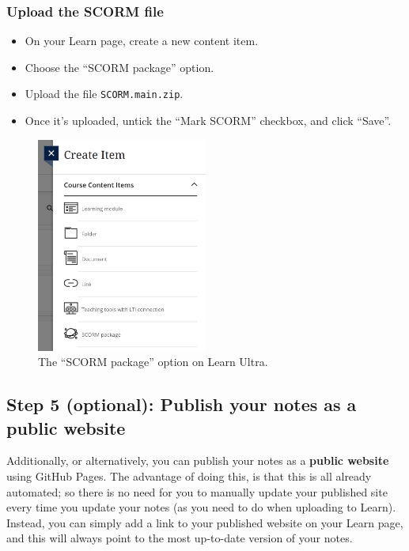 \subsubsection{Upload the SCORM file}
\label{ssec:scorm}

\begin{itemize}
    \item On your Learn page, create a new content item.
    \item Choose the ``SCORM package'' option.
    \item Upload the file \verb|SCORM.main.zip|.
    \item Once it's uploaded, untick the ``Mark SCORM'' checkbox, and click ``Save''.
\end{itemize}

\begin{figure}[h!]
    \centering
    \includegraphics[width=0.5\textwidth]{img/scorm.png}
    \caption{The ``SCORM package'' option on Learn Ultra.}
    \label{fig:scorm}
\end{figure}


\subsection{Step 5 (optional): Publish your notes as a public website}
\label{ssec:pub}

Additionally, or alternatively, you can publish your notes as a \textbf{public website} using GitHub Pages. The advantage of doing this, is that this is all already automated; so there is no need for you to manually update your published site every time you update your notes (as you need to do when uploading to Learn). Instead, you can simply add a link to your published website on your Learn page, and this will always point to the most up-to-date version of your notes.


